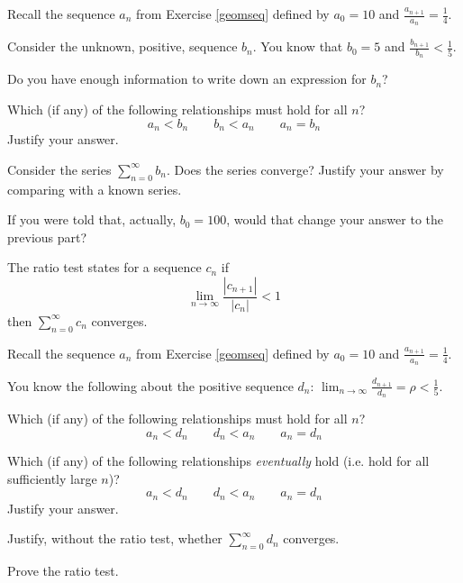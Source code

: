 \documentclass{workbook}
\begin{document}
\begin{slide}
	\question
	Recall the sequence $a_n$ from Exercise \ref{geomseq} defined by
	$a_0=10$ and
	$\displaystyle
		\frac{a_{n+1}}{a_n}= \frac{1}{4}
	$.

	Consider the unknown, positive, sequence $b_n$. You know that $b_0=5$ and 
	$\displaystyle \frac{b_{n+1}}{b_n} < \frac{1}{5}$.

	\begin{parts}
		\item Do you have enough information to write down an expression for $b_n$?

		\item Which (if any) of the following relationships must hold for all $n$?
		\[
			a_n < b_n \qquad b_n < a_n \qquad a_n = b_n
		\]
		Justify your answer. 

		\item Consider the series $\displaystyle \sum_{n=0}^\infty 
		b_n$. Does the series converge? Justify your answer by comparing with
		a known series.

		\item If you were told that, actually, $b_0=100$, would that
		change your answer to the previous part?
	\end{parts}

\end{slide}
\begin{slide}
	\question
	The ratio test states for a sequence $c_n$ if 
	\[
		\lim_{n\to\infty} \frac{|c_{n+1}|}{|c_n|} < 1
	\]
	then $\displaystyle \sum_{n=0}^\infty c_n$ converges.

	Recall the sequence $a_n$ from Exercise \ref{geomseq} defined by
	$a_0=10$ and
	$\displaystyle
		\frac{a_{n+1}}{a_n}= \frac{1}{4}
	$.

	You know the following about the positive sequence $d_n$: 
	$\displaystyle \lim_{n\to\infty} \frac{d_{n+1}}{d_n} =\rho < \frac{1}{5}$.

	\begin{parts}
		\item Which (if any) of the following relationships must hold for all $n$?
		\[
			a_n < d_n \qquad d_n < a_n \qquad a_n = d_n
		\]
		\item Which (if any) of the following relationships \emph{eventually} hold (i.e. hold for all sufficiently large $n$)?
		\[
			a_n < d_n \qquad d_n < a_n \qquad a_n = d_n
		\]
		Justify your answer.

		\item Justify, without the ratio test, whether $\displaystyle 
		\sum_{n=0}^\infty d_n$ converges.

		\item Prove the ratio test.
	\end{parts}
\end{slide}
\end{document}
